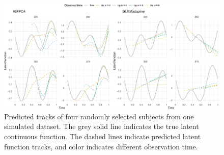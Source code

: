 \documentclass[
  11pt,
]{article}
\begin{document}
\begin{figure}
\centering
\includegraphics{Manuscript_edit_files/figure-latex/Figure-1.pdf}
\caption{Predicted tracks of four randomly selected subjects from one
simulated dataset. The grey solid line indicates the true latent
continuous function. The dashed lines indicate predicted latent function
tracks, and color indicates different observation time.}
\end{figure}
\end{document}
